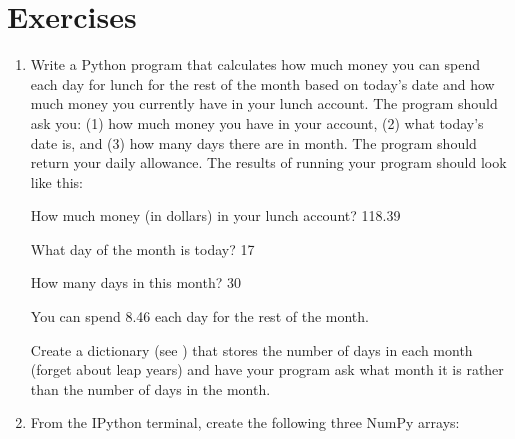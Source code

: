 \documentclass[letterpaper,10pt,english]{sphinxmanual}
\begin{document}
\section{Exercises}
\label{\detokenize{chap4/chap4_io:exercises}}\begin{enumerate}
%
\item {} 
\sphinxAtStartPar
Write a Python program that calculates how much money you can spend each day for lunch for the rest of the month based on today’s date and how much money you currently have in your lunch account.  The program should ask you: (1) how much money you have in your account, (2) what today’s date is, and (3) how many days there are in month.  The program should return your daily allowance.  The results of running your program should look like this:

\begin{sphinxVerbatim}[commandchars=\\\{\},numbers=left,firstnumber=1,stepnumber=1]
How much money (in dollars) in your lunch account? 118.39

What day of the month is today? 17

How many days in this month? 30

You can spend \PYGZdl{}8.46 each day for the rest of the month.
\end{sphinxVerbatim}

\sphinxAtStartPar
{} Create a dictionary (see {\hyperref[\detokenize{chap3/chap3_arrays:chap3dictionaries}]{}}) that stores the number of days in each month (forget about leap years) and have your program ask what month it is rather than the number of days in the month.

\item {} 
\sphinxAtStartPar
From the IPython terminal, create the following three NumPy arrays:

\begin{sphinxVerbatim}[commandchars=\\\{\}]
  \PYG{p}{[}   \PYG{p}{]}
  \PYG{p}{[}   \PYG{p}{]}
  \PYG{p}{[} \PYG{p}{]}
\end{sphinxVerbatim}


\end{enumerate}
\end{document}
